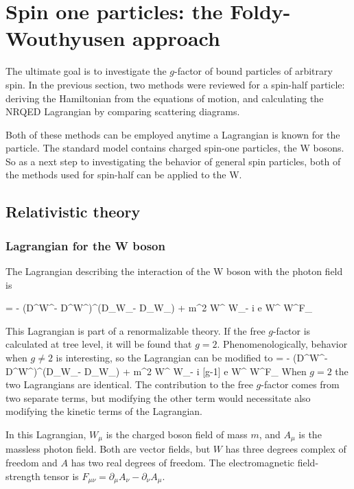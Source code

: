 \chapter{Spin one particles: the Foldy-Wouthyusen approach}


The ultimate goal is to investigate the $g$-factor of bound particles of arbitrary spin.  In the previous section, two methods were reviewed for a spin-half particle: deriving the Hamiltonian from the equations of motion, and calculating the NRQED Lagrangian by comparing scattering diagrams.  

Both of these methods can be employed anytime a Lagrangian is known for the particle.  The standard model contains charged spin-one particles, the W bosons.  So as a next step to investigating the behavior of general spin particles, both of the methods used for spin-half can be applied to the W.

\section{Relativistic theory}

\subsection{Lagrangian for the W boson}
The Lagrangian describing the interaction of the W boson with the photon field is

\beq
{} 
	=	- (D^\mu W^\nu - D^\nu W^\mu)^\dagger (D_\mu W_\nu - D_\nu W_\mu)
		+ m^2 W^{\mu \dagger} W_\mu - i e  W^{\mu \dagger} W^\nu F_{\mu\nu}
\eeq

This Lagrangian is part of a renormalizable theory.  If the free $g$-factor is calculated at tree level, it will be found that $g=2$.  Phenomenologically, behavior when $g \neq 2$ is interesting, so the Lagrangian can be modified to
\beq \label{eq:S1:LagrangianAnom}
	=	- (D^\mu W^\nu - D^\nu W^\mu)^\dagger (D_\mu W_\nu - D_\nu W_\mu)
		+ m^2 W^{\mu \dagger} W_\mu - i [g-1] e  W^{\mu \dagger} W^\nu F_{\mu\nu}
\eeq
When $g=2$ the two Lagrangians are identical.  The contribution to the free $g$-factor comes from two separate terms, but modifying the other term would necessitate also modifying the kinetic terms of the Lagrangian.  %

In this Lagrangian, $W_\mu$ is the charged boson field of mass $m$, and $A_\mu$ is the massless photon field.  Both are vector fields, but $W$ has three degrees complex of freedom and $A$ has two real degrees of freedom.    The electromagnetic field-strength tensor is $F_{\mu\nu} = \partial_\mu A_\nu - \partial_\nu A_\mu$.  


